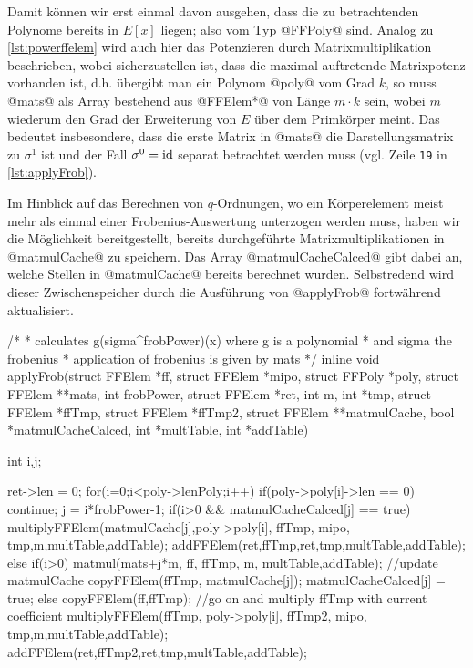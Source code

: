 Damit können wir erst einmal davon ausgehen, dass die zu betrachtenden Polynome
bereits in $E[x]$ liegen; also vom Typ @FFPoly@ sind. Analog zu 
\autoref{lst:powerffelem} wird auch hier das Potenzieren durch
Matrixmultiplikation beschrieben, wobei sicherzustellen ist, dass die maximal
auftretende Matrixpotenz vorhanden ist, d.h. übergibt man ein Polynom @poly@
vom Grad $k$, so muss @mats@ als Array bestehend aus @FFElem*@ von Länge
$m\cdot k$ sein, wobei $m$ wiederum den Grad der Erweiterung von $E$ über dem
Primkörper meint. Das bedeutet insbesondere, dass die erste Matrix in @mats@
die Darstellungsmatrix zu $\sigma^1$ ist und der Fall $\sigma^0 = \operatorname{id}$ separat
betrachtet werden muss (vgl. Zeile \texttt{19} in \autoref{lst:applyFrob}).

Im Hinblick auf das Berechnen von $q$-Ordnungen, wo ein Körperelement meist
mehr als einmal einer Frobenius-Auswertung unterzogen werden muss, haben wir
die Möglichkeit bereitgestellt, bereits durchgeführte Matrixmultiplikationen in
@matmulCache@ zu speichern. Das Array @matmulCacheCalced@ gibt dabei an, welche
Stellen in @matmulCache@ bereits berechnet wurden. Selbstredend wird dieser 
Zwischenspeicher durch die Ausführung von @applyFrob@ fortwährend aktualisiert.

\begin{ccode}[caption={[\texttt{void applyFrob} aus 
 \url{../Sage/enumeratePCNs.c}]Aus \url{../Sage/enumeratePCNs.c}},
  label=lst:applyFrob]
/*
 * calculates g(sigma^frobPower)(x) where g is a polynomial 
 * and sigma the frobenius
 * application of frobenius is given by mats
 */
inline void applyFrob(struct FFElem *ff, struct FFElem *mipo,
        struct FFPoly *poly,
        struct FFElem **mats,
        int frobPower, struct FFElem *ret, 
        int m, int *tmp, struct FFElem *ffTmp, struct FFElem *ffTmp2,
        struct FFElem **matmulCache, bool *matmulCacheCalced,
        int *multTable, int *addTable){
    int i,j;
        
    ret->len = 0;
    for(i=0;i<poly->lenPoly;i++){
        if(poly->poly[i]->len == 0) continue;
        j = i*frobPower-1;
        if(i>0 && matmulCacheCalced[j] == true){
            multiplyFFElem(matmulCache[j],poly->poly[i],
                    ffTmp, mipo,
                    tmp,m,multTable,addTable);
            addFFElem(ret,ffTmp,ret,tmp,multTable,addTable);
        }else{
            if(i>0){
                matmul(mats+j*m, ff, ffTmp, m, multTable,addTable);
                //update matmulCache
                copyFFElem(ffTmp, matmulCache[j]);
                matmulCacheCalced[j] = true;
            }else{
                copyFFElem(ff,ffTmp);
            }
            //go on and multiply ffTmp with current coefficient
            multiplyFFElem(ffTmp, poly->poly[i],
                    ffTmp2, mipo,
                    tmp,m,multTable,addTable);
            addFFElem(ret,ffTmp2,ret,tmp,multTable,addTable);
        }
    }
}
\end{ccode}

